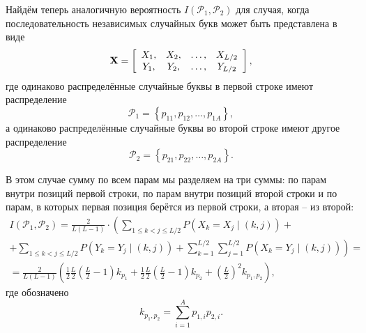 Найдём теперь аналогичную вероятность $I\left( {\mathcal{P}_1 ,\mathcal{P}_2 } \right)$ для случая, когда последовательность независимых случайных букв может быть представлена в виде
\[
\mathbf{X} = \left[ {\begin{array}{*{20}c}
   {X_1 ,}  \\
   {Y_1 ,}  \\
 \end{array} \begin{array}{*{20}c}
   {X_2 ,}  \\
   {Y_2 ,}  \\
 \end{array} \begin{array}{*{20}c}
   { \ldots ,}  \\
   { \ldots ,}  \\
 \end{array} \begin{array}{*{20}c}
   {X_{L/2} }  \\
   {Y_{L/2} }  \\
 \end{array} } \right],
\]
где одинаково распределённые случайные буквы в первой строке имеют распределение
    \[ \mathcal{P}_1  = \left\{ {p_{11} ,p_{12} , \ldots , p_{1A} } \right\}, \]
а одинаково распределённые случайные буквы во второй строке имеют другое распределение
    \[ \mathcal{P}_2  = \left\{ {p_{21} ,p_{22} , \ldots , p_{2A} } \right\}. \]

В этом случае сумму по всем парам мы разделяем на три суммы: по парам внутри позиций первой строки, по парам внутри позиций второй строки и по парам, в которых первая позиция берётся из первой строки, а вторая -- из второй:
\begin{multline*}
I(\mathcal{P}_1, \mathcal{P}_2) =
        \frac{2}{L(L - 1)} \cdot \left(
        \sum \limits_{1 \leq k < j \leq L/2} P( X_k  = X_j \mid ( k,j )) + \right.
\\
        \left. + \sum\limits_{1 \leq k < j \leq L/2} P(Y_k  = Y_j \mid (k,j)) +
            \sum\limits_{k=1}^{L/2} \sum\limits_{j=1}^{L/2} {P(X_k = Y_j \mid (k,j))} \right) =
\\
    = \frac{2}{L(L - 1)} \left( \frac{1}{2} \frac{L}{2} \left( \frac{L}{2} - 1 \right) k_{p_1} +
        \frac{1}{2} \frac{L}{2} \left( \frac{L}{2} - 1 \right) k_{p_2} +
        \left( \frac{L}{2} \right)^2 k_{p_1, p_2} \right),
\end{multline*}
где обозначено
    \[ k_{p_1, p_2}  = \sum\limits_{i=1}^A p_{1,i} p_{2,i}. \]

